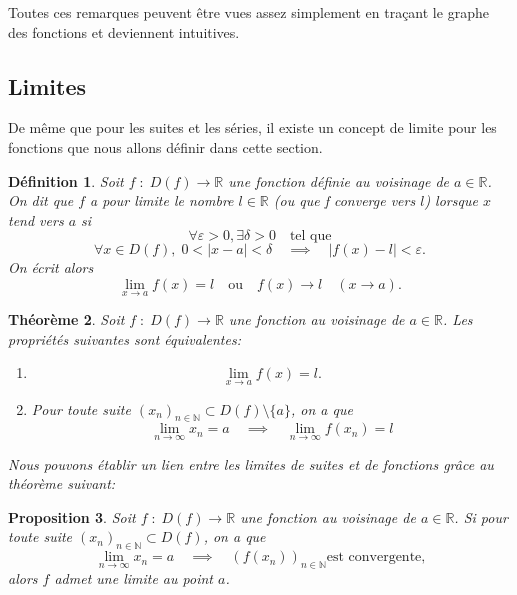 \documentclass[a4paper, 12pt, french, twoside]{article}
\newtheorem{theorem}{Théorème}[section]
\newtheorem{proposition}[theorem]{Proposition}
\newtheorem{defi}[theorem]{Définition}
\newcommand{\Nn}{{\mathbb{N}}}
\newcommand{\Rr}{{\mathbb{R}}}
\begin{document}
Toutes ces remarques peuvent être vues assez simplement en traçant le graphe des fonctions et deviennent intuitives.
   \subsection{Limites}
   De même que pour les suites et les séries, il existe un concept de limite pour les fonctions que nous allons définir dans cette section. 

\begin{defi}
    Soit $f\; :\; D(f) \longrightarrow \Rr$ une fonction définie au voisinage de $a\in \Rr$.
    On dit que $f$ a pour limite le nombre $l\in\Rr$ (ou que f converge vers $l$) lorsque $x$ tend vers $a$ si \[
    \forall \varepsilon>0,\exists\delta>0 \quad\text{tel que}
    \]
    \[
     \forall x\in D(f), \;0<|x-a|<\delta \quad \implies \quad |f(x)-l|<\varepsilon .
    \]
    On écrit alors 
    \[
    \lim_{x\rightarrow a}f(x)=l \quad\text{ou}\quad f(x)\longrightarrow l \quad (x\rightarrow a).
    \]
\end{defi}
\begin{theorem} \label{theoreme limites finies fonctions}
    Soit $f\;:\;D(f)\longrightarrow\Rr$ une fonction au voisinage de $a\in\Rr$. 
    Les propriétés suivantes sont équivalentes:
    \begin{enumerate}
        \item \[\lim_{x\rightarrow a}f(x)=l.\]
        \item Pour toute suite $(x_n)_{n\in\Nn}\subset D(f)\setminus\{a\}$, on a que 
        \[
        \lim_{n\rightarrow \infty}x_n=a \quad \implies \quad \lim_{n\rightarrow \infty}f(x_n)=l
        \]
    \end{enumerate}
    Nous pouvons établir un lien entre les limites de suites et de fonctions grâce au théorème suivant: 
\end{theorem}
\begin{proposition}
    Soit $f\;:\;D(f)\longrightarrow\Rr$ une fonction au voisinage de $a\in\Rr$. 
    Si pour toute suite  $(x_n)_{n\in\Nn}\subset D(f)$, on a que 
    \[
    \lim_{n\rightarrow \infty}x_n=a\quad \implies \quad (f(x_n))_{n\in\Nn} \text{est convergente,}
    \]
    alors $f$ admet une limite au point $a$.
\end{proposition}
\end{document}
